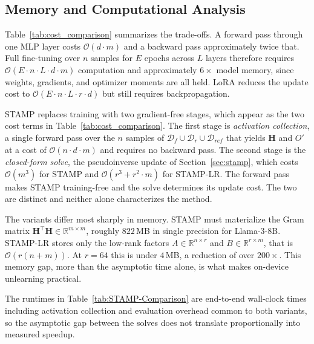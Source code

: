 \subsection{Memory and Computational Analysis}
Table~\ref{tab:cost_comparison} summarizes the trade-offs. A forward pass through one MLP layer costs $\mathcal{O}(d \cdot m)$ and a backward pass approximately twice that. Full fine-tuning over $n$ samples for $E$ epochs across $L$ layers therefore requires $\mathcal{O}(E \cdot n \cdot L \cdot d \cdot m)$ computation and approximately $6\times$ model memory, since weights, gradients, and optimizer moments are all held. LoRA reduces the update cost to $\mathcal{O}(E \cdot n \cdot L \cdot r \cdot d)$ but still requires backpropagation.

STAMP replaces training with two gradient-free stages, which appear as the two cost terms in Table~\ref{tab:cost_comparison}. The first stage is \textit{activation collection}, a single forward pass over the $n$ samples of $\mathcal{D}_f \cup \mathcal{D}_r \cup \mathcal{D}_{\textit{ref}}$ that yields $\mathbf{H}$ and $O'$ at a cost of $\mathcal{O}(n \cdot d \cdot m)$ and requires no backward pass. The second stage is the \textit{closed-form solve}, the pseudoinverse update of Section~\ref{sec:stamp}, which costs $\mathcal{O}(m^{3})$ for STAMP and $\mathcal{O}(r^{3} + r^{2} \cdot m)$ for STAMP-LR. The forward pass makes STAMP training-free and the solve determines its update cost. The two are distinct and neither alone characterizes the method.

The variants differ most sharply in memory. STAMP must materialize the Gram matrix $\mathbf{H}^{\top}\mathbf{H} \in \mathbb{R}^{m \times m}$, roughly $822$\,MB in single precision for Llama-3-8B. STAMP-LR stores only the low-rank factors $A \in \mathbb{R}^{n \times r}$ and $B \in \mathbb{R}^{r \times m}$, that is $\mathcal{O}(r(n + m))$. At $r = 64$ this is under $4$\,MB, a reduction of over $200\times$. This memory gap, more than the asymptotic time alone, is what makes on-device unlearning practical.

The runtimes in Table~\ref{tab:STAMP-Comparison} are end-to-end wall-clock times including activation collection and evaluation overhead common to both variants, so the asymptotic gap between the solves does not translate proportionally into measured speedup.

